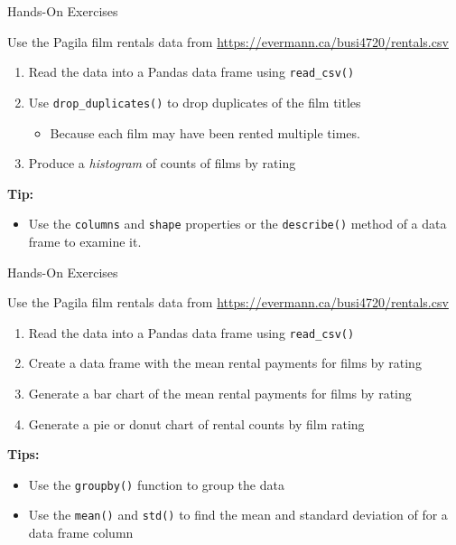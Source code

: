 \documentclass[ignorenonframetext,xcolor=x11names]{beamer}
\begin{document}
\begin{frame}{Hands-On Exercises}

\footnotesize
Use the Pagila film rentals data from \url{https://evermann.ca/busi4720/rentals.csv}
\begin{enumerate}
   \item Read the data into a Pandas data frame using \texttt{read\_csv()}
   \item Use \texttt{drop\_duplicates()} to drop duplicates of the film titles
   \begin{itemize}
      \item Because each film may have been rented multiple times.
   \end{itemize}
   \item Produce a \emph{histogram} of counts of films by rating
\end{enumerate}
\vspace{\baselineskip}
\textbf{Tip:}
\begin{itemize}
\item Use the \texttt{columns} and \texttt{shape} properties or the \texttt{describe()} method of a data frame to examine it. 
\end{itemize}
\end{frame}

\begin{frame}{Hands-On Exercises}

\footnotesize
Use the Pagila film rentals data from \url{https://evermann.ca/busi4720/rentals.csv}
\begin{enumerate}
   \item Read the data into a Pandas data frame using \texttt{read\_csv()}
   \item Create a data frame with the mean rental payments for films by rating
   \item Generate a bar chart of the mean rental payments for films by rating
   \item Generate a pie or donut chart of rental counts by film rating
\end{enumerate}

\vspace{\baselineskip}
\textbf{Tips:}
\begin{itemize}
   \item Use the \texttt{groupby()} function to group the data
   \item Use the \texttt{mean()} and \texttt{std()} to find the mean and standard deviation of for a data frame column
\end{itemize}
\end{frame}
\end{document}

